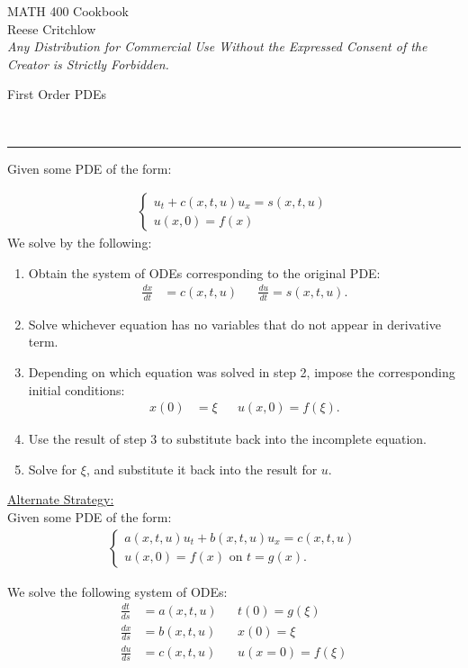 \documentclass{article}
\newcommand{\header}[1]{\begin{large}\noindent #1\end{large}\\\rule{\textwidth}{0.5pt}}
\newcommand{\sheader}[1]{\underline{#1:}}
\newcommand{\gap}{\medskip\\}
\begin{document}
\begin{center}
        \Large MATH 400 Cookbook\\
        \normalsize Reese Critchlow\\
        \textit{Any Distribution for Commercial Use Without the Expressed Consent of the Creator is Strictly Forbidden.}
\end{center}

\header{First Order PDEs}

Given some PDE of the form:

\begin{align*}
    \begin{cases}
        u_t + c(x, t, u)u_x = s(x, t, u)\\
        u(x, 0) = f(x)
    \end{cases}
\end{align*}
We solve by the following:
\begin{enumerate}
    \item Obtain the system of ODEs corresponding to the original PDE:
    \begin{align*}
        \frac{dx}{dt} &= c(x, t, u) && \frac{du}{dt} = s(x, t, u).
    \end{align*}
    \item Solve whichever equation has no variables that do not appear in derivative term.
    \item Depending on which equation was solved in step 2, impose the corresponding initial conditions:
    \begin{align*}
        x(0) &= \xi && u(x, 0) = f(\xi).
    \end{align*}
    \item Use the result of step 3 to substitute back into the incomplete equation.
    \item Solve for $\xi$, and substitute it back into the result for $u$.
\end{enumerate}

\sheader{Alternate Strategy}
\gap
Given some PDE of the form:
\begin{align*}
    \begin{cases}
        a(x, t, u)u_t + b(x, t, u)u_x = c(x, t, u)\\
        u(x, 0) = f(x) \textrm{ on } t = g(x).
    \end{cases}
\end{align*}

We solve the following system of ODEs:
\begin{align*}
    \frac{dt}{ds} &= a(x, t, u) && t(0) = g(\xi)\\
    \frac{dx}{ds} &= b(x, t, u) && x(0) = \xi\\
    \frac{du}{ds} &= c(x, t, u) && u(x=0) = f(\xi)
\end{align*}
\end{document}
